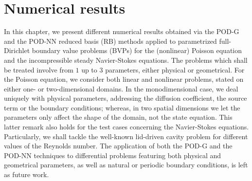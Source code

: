 \documentclass[12pt, a4paper, twoside, openright]{report}
\numberwithin{equation}{chapter}
\theoremstyle{theorem}
\theoremstyle{definition}
\theoremstyle{remark}
\theoremstyle{proposition}
\numberwithin{figure}{chapter}
\begin{document}
	
		
	\chapter{Numerical results}
	\label{chapter:Numerical results}
	
		In this chapter, we present different numerical results obtained via the POD-G and the POD-NN reduced basis (RB) methods applied to parametrized full-Dirichlet boundary value problems (BVPs) for the (nonlinear) Poisson equation and the incompressible steady Navier-Stokes equations. The problems which shall be treated involve from $1$ up to $3$ parameters, either physical or geometrical. For the Poisson equation, we consider both linear and nonlinear problems, stated on either one- or two-dimensional domains. In the monodimensional case, we deal uniquely with physical parameters, addressing the diffusion coefficient, the source term or the boundary conditions; whereas, in two spatial dimensions we let the parameters only affect the shape of the domain, not the state equation. This latter remark also holds for the test cases concerning the Navier-Stokes equations. Particularly, we shall tackle the well-known lid-driven cavity problem for different values of the Reynolds number. The application of both the POD-G and the POD-NN techniques to differential problems featuring both physical and geometrical parameters, as well as natural or periodic boundary conditions, is left as future work.
		
\end{document}
